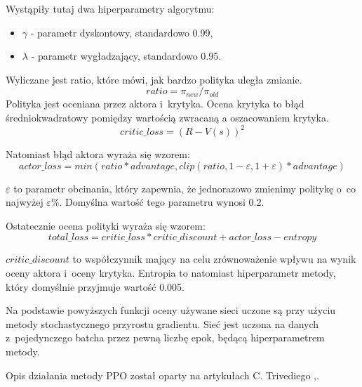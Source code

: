 \documentclass[a4paper,12pt]{article}
\begin{document}
Wystąpiły tutaj dwa hiperparametry algorytmu:
\begin{itemize}
	\item $\gamma$ - parametr dyskontowy, standardowo 0.99,
	\item $\lambda$ - parametr wygładzający, standardowo 0.95.
\end{itemize}

Wyliczane jest ratio, które mówi, jak bardzo polityka uległa zmianie.
\begin{equation}
	ratio = \pi_{new} / \pi_{old}
\end{equation}
Polityka jest oceniana przez aktora i~krytyka. Ocena krytyka to błąd średniokwadratowy pomiędzy wartością zwracaną a oszacowaniem krytyka.
\begin{equation}
	critic\_loss = (R - V(s))^2
\end{equation}

Natomiast błąd aktora wyraża się wzorem:
\begin{equation}
	actor\_loss = min(ratio * advantage, clip(ratio, 1-\varepsilon,1+\varepsilon)* advantage)
\end{equation}

$\varepsilon$ to parametr obcinania, który zapewnia, że jednorazowo zmienimy politykę o~co najwyżej $\varepsilon\%$. Domyślna wartość tego parametru wynosi 0.2.

Ostatecznie ocena polityki wyraża się wzorem:
\begin{equation}
	total\_loss = critic\_loss * critic\_discount + actor\_loss - entropy
\end{equation}

$critic\_discount$ to współczynnik mający na celu zrównoważenie wpływu na wynik oceny aktora i~oceny krytyka. Entropia to natomiast hiperparametr metody, który domyślnie przyjmuje wartość 0.005. 

Na podstawie powyższych funkcji oceny używane sieci uczone są przy użyciu metody stochastycznego przyrostu gradientu. Sieć jest uczona na danych z~pojedynczego batcha przez pewną liczbę epok, będącą hiperparametrem metody.

Opis działania metody PPO został oparty na artykułach C. Trivediego \cite{ppo1},\cite{ppo2}.

\end{document}
